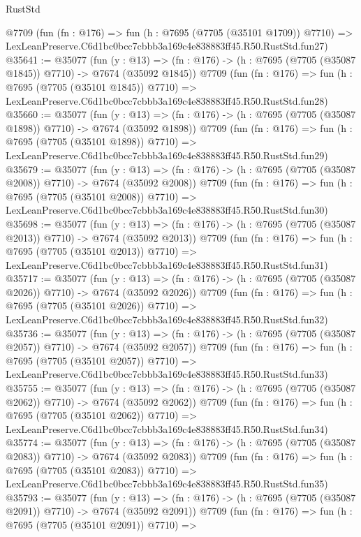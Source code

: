 \begin{lexlean}{RustStd}
\begin{coremodule}
    @7709
    (fun (fn : @176) =>
    fun (h : @7695 (@7705 (@35101 @1709)) @7710) =>
    LexLeanPreserve.C6d1bc0bcc7cbbb3a169c4e838883ff45.R50.RustStd.fun27)
@35641 := @35077
    (fun (y : @13) =>
    (fn : @176) -> (h : @7695 (@7705 (@35087 @1845)) @7710) -> @7674 (@35092 @1845))
    @7709
    (fun (fn : @176) =>
    fun (h : @7695 (@7705 (@35101 @1845)) @7710) =>
    LexLeanPreserve.C6d1bc0bcc7cbbb3a169c4e838883ff45.R50.RustStd.fun28)
@35660 := @35077
    (fun (y : @13) =>
    (fn : @176) -> (h : @7695 (@7705 (@35087 @1898)) @7710) -> @7674 (@35092 @1898))
    @7709
    (fun (fn : @176) =>
    fun (h : @7695 (@7705 (@35101 @1898)) @7710) =>
    LexLeanPreserve.C6d1bc0bcc7cbbb3a169c4e838883ff45.R50.RustStd.fun29)
@35679 := @35077
    (fun (y : @13) =>
    (fn : @176) -> (h : @7695 (@7705 (@35087 @2008)) @7710) -> @7674 (@35092 @2008))
    @7709
    (fun (fn : @176) =>
    fun (h : @7695 (@7705 (@35101 @2008)) @7710) =>
    LexLeanPreserve.C6d1bc0bcc7cbbb3a169c4e838883ff45.R50.RustStd.fun30)
@35698 := @35077
    (fun (y : @13) =>
    (fn : @176) -> (h : @7695 (@7705 (@35087 @2013)) @7710) -> @7674 (@35092 @2013))
    @7709
    (fun (fn : @176) =>
    fun (h : @7695 (@7705 (@35101 @2013)) @7710) =>
    LexLeanPreserve.C6d1bc0bcc7cbbb3a169c4e838883ff45.R50.RustStd.fun31)
@35717 := @35077
    (fun (y : @13) =>
    (fn : @176) -> (h : @7695 (@7705 (@35087 @2026)) @7710) -> @7674 (@35092 @2026))
    @7709
    (fun (fn : @176) =>
    fun (h : @7695 (@7705 (@35101 @2026)) @7710) =>
    LexLeanPreserve.C6d1bc0bcc7cbbb3a169c4e838883ff45.R50.RustStd.fun32)
@35736 := @35077
    (fun (y : @13) =>
    (fn : @176) -> (h : @7695 (@7705 (@35087 @2057)) @7710) -> @7674 (@35092 @2057))
    @7709
    (fun (fn : @176) =>
    fun (h : @7695 (@7705 (@35101 @2057)) @7710) =>
    LexLeanPreserve.C6d1bc0bcc7cbbb3a169c4e838883ff45.R50.RustStd.fun33)
@35755 := @35077
    (fun (y : @13) =>
    (fn : @176) -> (h : @7695 (@7705 (@35087 @2062)) @7710) -> @7674 (@35092 @2062))
    @7709
    (fun (fn : @176) =>
    fun (h : @7695 (@7705 (@35101 @2062)) @7710) =>
    LexLeanPreserve.C6d1bc0bcc7cbbb3a169c4e838883ff45.R50.RustStd.fun34)
@35774 := @35077
    (fun (y : @13) =>
    (fn : @176) -> (h : @7695 (@7705 (@35087 @2083)) @7710) -> @7674 (@35092 @2083))
    @7709
    (fun (fn : @176) =>
    fun (h : @7695 (@7705 (@35101 @2083)) @7710) =>
    LexLeanPreserve.C6d1bc0bcc7cbbb3a169c4e838883ff45.R50.RustStd.fun35)
@35793 := @35077
    (fun (y : @13) =>
    (fn : @176) -> (h : @7695 (@7705 (@35087 @2091)) @7710) -> @7674 (@35092 @2091))
    @7709
    (fun (fn : @176) =>
    fun (h : @7695 (@7705 (@35101 @2091)) @7710) =>

\end{coremodule}
\end{lexlean}
